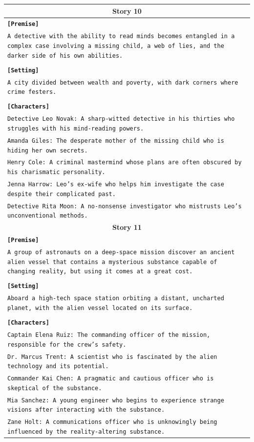 \documentclass[letterpaper]{article} %
\begin{document}
\begin{small}
\begin{longtable}{p{\textwidth}}
    \multicolumn{1}{c}{\textbf{Story 10}} \\
    \midrule
    \texttt{\textbf{[Premise]}} \\
    \texttt{A detective with the ability to read minds becomes entangled in a complex case involving a missing child, a web of lies, and the darker side of his own abilities.} \\\\
    \texttt{\textbf{[Setting]}} \\
    \texttt{A city divided between wealth and poverty, with dark corners where crime festers.} \\\\
    \texttt{\textbf{[Characters]}} \\
    \texttt{Detective Leo Novak: A sharp-witted detective in his thirties who struggles with his mind-reading powers.} \\
    \texttt{Amanda Giles: The desperate mother of the missing child who is hiding her own secrets.} \\
    \texttt{Henry Cole: A criminal mastermind whose plans are often obscured by his charismatic personality.} \\
    \texttt{Jenna Harrow: Leo's ex-wife who helps him investigate the case despite their complicated past.} \\
    \texttt{Detective Rita Moon: A no-nonsense investigator who mistrusts Leo's unconventional methods.} \\
    \midrule
  
    \multicolumn{1}{c}{\textbf{Story 11}} \\
    \midrule
    \texttt{\textbf{[Premise]}} \\
    \texttt{A group of astronauts on a deep-space mission discover an ancient alien vessel that contains a mysterious substance capable of changing reality, but using it comes at a great cost.} \\\\
    \texttt{\textbf{[Setting]}} \\
    \texttt{Aboard a high-tech space station orbiting a distant, uncharted planet, with the alien vessel located on its surface.} \\\\
    \texttt{\textbf{[Characters]}} \\
    \texttt{Captain Elena Ruiz: The commanding officer of the mission, responsible for the crew's safety.} \\
    \texttt{Dr. Marcus Trent: A scientist who is fascinated by the alien technology and its potential.} \\
    \texttt{Commander Kai Chen: A pragmatic and cautious officer who is skeptical of the substance.} \\
    \texttt{Mia Sanchez: A young engineer who begins to experience strange visions after interacting with the substance.} \\
    \texttt{Zane Holt: A communications officer who is unknowingly being influenced by the reality-altering substance.} \\
    \midrule
  

\end{longtable}
\end{small}
\end{document}
